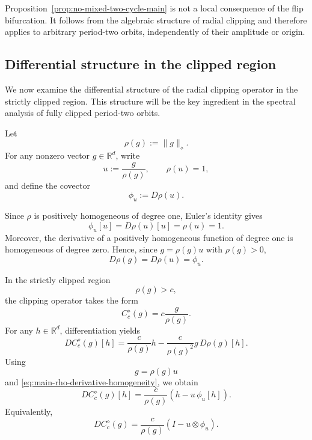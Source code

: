 \begin{remark}
\label{rem:no-mixed-global}
Proposition~\ref{prop:no-mixed-two-cycle-main} is not a local
consequence of the flip bifurcation.  It follows from the algebraic
structure of radial clipping and therefore applies to arbitrary
period-two orbits, independently of their amplitude or origin.
\end{remark}

\subsection{Differential structure in the clipped region}
\label{subsec:clipped-differential-main}
We now examine the differential structure of the radial clipping
operator in the strictly clipped region. This structure will be
the key ingredient in the spectral analysis of fully clipped
period-two orbits.

Let
\[
\rho(g):=\|g\|_\diamond .
\]
For any nonzero vector $g\in\mathbb{R}^d$, write
\[
u:=\frac{g}{\rho(g)},
\qquad
\rho(u)=1,
\]
and define the covector
\[
\phi_u:=D\rho(u).
\]

Since $\rho$ is positively homogeneous of degree one,
Euler's identity gives
\begin{equation}
\phi_u[u]
=
D\rho(u)[u]
=
\rho(u)
=
1.
\label{eq:main-euler-rho}
\end{equation}
Moreover, the derivative of a positively homogeneous function
of degree one is homogeneous of degree zero. Hence, since
$g=\rho(g)u$ with $\rho(g)>0$,
\begin{equation}
D\rho(g)=D\rho(u)=\phi_u.
\label{eq:main-rho-derivative-homogeneity}
\end{equation}

In the strictly clipped region
\[
\rho(g)>c,
\]
the clipping operator takes the form
\[
C_c^\diamond(g)
=
c\frac{g}{\rho(g)}.
\]
For any $h\in\mathbb{R}^d$, differentiation yields
\[
DC_c^\diamond(g)[h]
=
\frac{c}{\rho(g)}h
-
\frac{c}{\rho(g)^2}
g\,D\rho(g)[h].
\]
Using
\[
g=\rho(g)u
\]
and \eqref{eq:main-rho-derivative-homogeneity}, we obtain
\[
DC_c^\diamond(g)[h]
=
\frac{c}{\rho(g)}
\left(
h-u\,\phi_u[h]
\right).
\]
Equivalently,
\begin{equation}
DC_c^\diamond(g)
=
\frac{c}{\rho(g)}
\left(
I-u\otimes\phi_u
\right).
\label{eq:main-clipping-derivative}
\end{equation}

